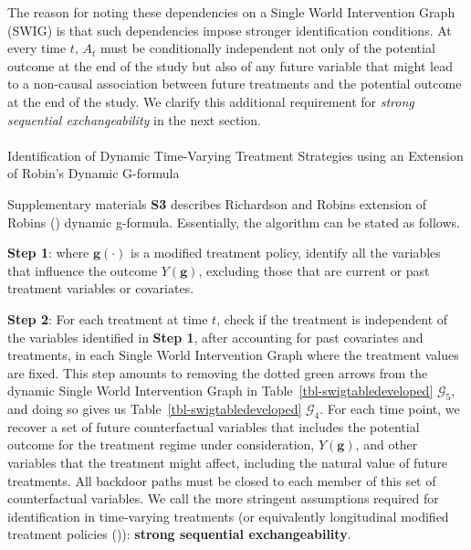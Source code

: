 \documentclass[
  single column]{article}
\makeatletter
\let\oldparagraph\paragraph
\renewcommand{\paragraph}{
    \@ifstar
      \xxxParagraphStar
      \xxxParagraphNoStar
  }
\newcommand{\xxxParagraphStar}[1]{\oldparagraph*{#1}\mbox{}}
\newcommand{\xxxParagraphNoStar}[1]{\oldparagraph{#1}\mbox{}}
\makeatother
\begin{document}
The reason for noting these dependencies on a Single World Intervention
Graph (SWIG) is that such dependencies impose stronger identification
conditions. At every time \(t\), \(A_t\) must be conditionally
independent not only of the potential outcome at the end of the study
but also of any future variable that might lead to a non-causal
association between future treatments and the potential outcome at the
end of the study. We clarify this additional requirement for
\emph{strong sequential exchangeability} in the next section.

\paragraph{Identification of Dynamic Time-Varying Treatment Strategies
using an Extension of Robin's Dynamic
G-formula}\label{identification-of-dynamic-time-varying-treatment-strategies-using-an-extension-of-robins-dynamic-g-formula}

Supplementary materials \textbf{S3} describes Richardson and Robins
extension of Robins () dynamic g-formula.
Essentially, the algorithm can be stated as follows.

\textbf{Step 1}: where \(\mathbf{g}(\cdot)\) is a modified treatment
policy, identify all the variables that influence the outcome
\(Y(\mathbf{g})\), excluding those that are current or past treatment
variables or covariates.

\textbf{Step 2}: For each treatment at time \(t\), check if the
treatment is independent of the variables identified in \textbf{Step 1},
after accounting for past covariates and treatments, in each Single
World Intervention Graph where the treatment values are fixed. This step
amounts to removing the dotted green arrows from the dynamic Single
World Intervention Graph in Table~\ref{tbl-swigtabledeveloped}
\(\mathcal{G}_5\), and doing so gives us
Table~\ref{tbl-swigtabledeveloped} \(\mathcal{G}_4\). For each time
point, we recover a set of future counterfactual variables that includes
the potential outcome for the treatment regime under consideration,
\(Y(\mathbf{g})\), and other variables that the treatment might affect,
including the natural value of future treatments. All backdoor paths
must be closed to each member of this set of counterfactual variables.
We call the more stringent assumptions required for identification in
time-varying treatments (or equivalently longitudinal modified treatment
policies ()):
\textbf{strong sequential exchangeability}.
\end{document}
